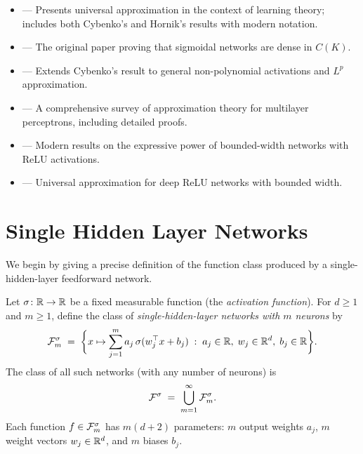 \documentclass[11pt,a4paper]{article}
\begin{document}
\begin{itemize}
  \item \citet[Chapter 6]{bach2024} --- Presents universal approximation in
    the context of learning theory; includes both Cybenko's and Hornik's
    results with modern notation.
  \item \citet{cybenko1989} --- The original paper proving that sigmoidal
    networks are dense in $C(K)$.
  \item \citet{hornik1989} --- Extends Cybenko's result to general
    non-polynomial activations and $L^p$ approximation.
  \item \citet{pinkus1999} --- A comprehensive survey of approximation
    theory for multilayer perceptrons, including detailed proofs.
  \item \citet{lu2017} --- Modern results on the expressive power of
    bounded-width networks with ReLU activations.
  \item \citet{hanin2019} --- Universal approximation for deep ReLU
    networks with bounded width.
\end{itemize}

\section{Single Hidden Layer Networks}
\label{sec:single-layer}

We begin by giving a precise definition of the function class produced by
a single-hidden-layer feedforward network.

\begin{definition}
\label{def:single-layer}
Let $\sigma \colon \mathbb{R} \to \mathbb{R}$ be a fixed measurable function (the
\emph{activation function}).  For $d \ge 1$ and $m \ge 1$, define the class
of \emph{single-hidden-layer networks with $m$ neurons} by
\[
  \mathcal{F}_m^{\sigma}
  \;=\;
  \biggl\{
    x \mapsto \sum_{j=1}^{m} a_j \, \sigma(w_j^\top x + b_j)
    \;:\;
    a_j \in \mathbb{R}, \;
    w_j \in \mathbb{R}^d, \;
    b_j \in \mathbb{R}
  \biggr\}.
\]
The class of all such networks (with any number of neurons) is
\[
  \mathcal{F}^{\sigma}
  \;=\;
  \bigcup_{m=1}^{\infty} \mathcal{F}_m^{\sigma}.
\]
Each function $f \in \mathcal{F}_m^{\sigma}$ has $m(d+2)$ parameters:
$m$ output weights $a_j$, $m$ weight vectors $w_j \in \mathbb{R}^d$, and $m$
biases $b_j$.
\end{definition}
\end{document}
